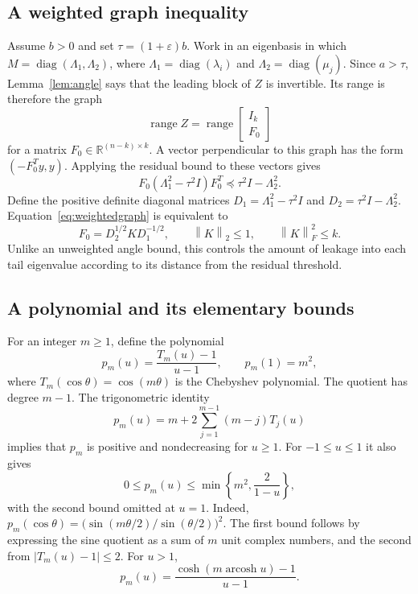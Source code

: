 \documentclass[11pt]{article}
\numberwithin{equation}{section}
\theoremstyle{definition}
\newcommand{\R}{\mathbb R}
\newcommand{\norm}[1]{\left\lVert#1\right\rVert}
\newcommand{\range}{\operatorname{range}}
\newcommand{\diag}{\operatorname{diag}}
\newcommand{\eps}{\varepsilon}
\begin{document}
\subsection{A weighted graph inequality}
Assume $b>0$ and set $\tau=(1+\eps)b$. Work in an eigenbasis in which
$M=\diag(\Lambda_1,\Lambda_2)$, where $\Lambda_1=\diag(\lambda_i)$ and
$\Lambda_2=\diag(\mu_j)$. Since $a>\tau$, Lemma~\ref{lem:angle} says that
the leading block of $Z$ is invertible. Its range is therefore the graph
\[
 \range Z=\range\begin{bmatrix}I_k\\F_0\end{bmatrix}
\]
for a matrix $F_0\in\R^{(n-k)\times k}$. A vector perpendicular to this graph
has the form $(-F_0^Ty,y)$. Applying the residual bound to these vectors gives
\begin{equation}
 F_0(\Lambda_1^2-\tau^2I)F_0^T\preceq\tau^2I-\Lambda_2^2.
 \label{eq:weightedgraph}
\end{equation}
Define the positive definite diagonal matrices
$D_1=\Lambda_1^2-\tau^2I$ and $D_2=\tau^2I-\Lambda_2^2$.
Equation~\eqref{eq:weightedgraph} is equivalent to
\begin{equation}
 F_0=D_2^{1/2}KD_1^{-1/2},\qquad \norm K_2\le1,
 \qquad\norm K_F^2\le k.
 \label{eq:contract}
\end{equation}
Unlike an unweighted angle bound, this controls the amount of leakage into
each tail eigenvalue according to its distance from the residual threshold.

\subsection{A polynomial and its elementary bounds}
For an integer $m\ge1$, define the polynomial
\begin{equation}
 p_m(u)=\frac{T_m(u)-1}{u-1},\qquad p_m(1)=m^2,
 \label{eq:fejer}
\end{equation}
where $T_m(\cos\theta)=\cos(m\theta)$ is the Chebyshev polynomial.
The quotient has degree $m-1$. The trigonometric identity
\begin{equation}
 p_m(u)=m+2\sum_{j=1}^{m-1}(m-j)T_j(u)
 \label{eq:fejerexpansion}
\end{equation}
implies that $p_m$ is positive and nondecreasing for $u\ge1$.
For $-1\le u\le1$ it also gives
\begin{equation}
 0\le p_m(u)\le\min\left\{m^2,\frac2{1-u}\right\},
 \label{eq:fejertail}
\end{equation}
with the second bound omitted at $u=1$. Indeed,
$p_m(\cos\theta)=\bigl(\sin(m\theta/2)/\sin(\theta/2)\bigr)^2$.
The first bound follows by expressing the sine quotient as a sum of $m$
unit complex numbers, and the second from $|T_m(u)-1|\le2$.
For $u>1$,
\begin{equation}
 p_m(u)=\frac{\cosh(m\operatorname{arcosh}u)-1}{u-1}.
 \label{eq:fejerhead}
\end{equation}
\end{document}
